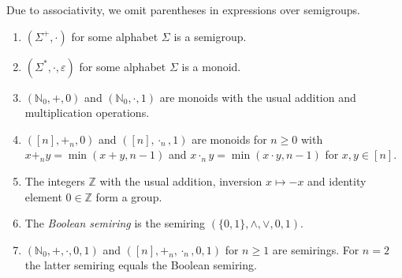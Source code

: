 Due to associativity, we omit parentheses in %
expressions over semigroups.

\begin{example}\label{prelim:ex:algstructures}
\begin{enumerate}
\item $(\Sigma^+, \cdot)$ for some alphabet $\Sigma$ is a semigroup. 

\item $(\Sigma^*, \cdot, \varepsilon)$ for some alphabet $\Sigma$ is a monoid.

\item $(\mathbb N_0, +, 0)$ and $(\mathbb N_0, \cdot, 1)$ are monoids with the usual addition and multiplication 
operations.

\item $([n], +_n, 0)$ and $([n], \cdot_n, 1)$ are monoids for $n \ge 0$
with $x +_n y = \min(x + y, n-1)$ 
and $x \cdot_n y = \min(x\cdot y, n-1)$ \label{def:plusmaln}
for $x,y \in [n]$.

\item The integers $\mathbb Z$ with the usual addition, inversion $x \mapsto -x$
and identity element $0 \in \mathbb Z$ form a group.
	
\item The \emph{Boolean semiring}  
 is the semiring $(\{0,1\}, \land, \lor, 0, 1)$.
 
\item $(\mathbb N_0, +, \cdot, 0, 1)$ and $([n], +_n, \cdot_n, 0, 1)$ for $n \ge 1$
 are semirings. For $n = 2$ the latter semiring equals the Boolean semiring.
\end{enumerate}	
\end{example}

